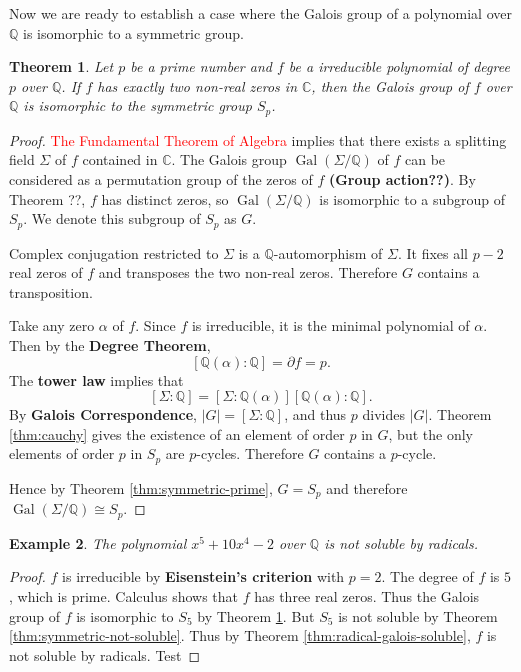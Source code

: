 \documentclass[12pt]{article}
\newtheorem{theorem}{Theorem}
\newtheorem{example}[theorem]{Example}
\newcommand{\Gal}{\operatorname{Gal}}
\begin{document}
Now we are ready to establish a case where the Galois group of a polynomial
over $\mathbb Q$ is isomorphic to a symmetric group.

\begin{theorem} \label{thm:galois-iso-symmetric}
    Let $p$ be a prime number and $f$ be a irreducible polynomial of degree $p$
    over $\mathbb Q$. If $f$ has exactly two non-real zeros in $\mathbb C$,
    then
    the Galois group of $f$ over $\mathbb Q$ is isomorphic to the symmetric
    group
    $S_p$.
\end{theorem}

\begin{proof}
    \textcolor{red}{The Fundamental Theorem of Algebra} implies that there
    exists a splitting field $\Sigma $ of $f$ contained in $\mathbb C$. The
    Galois
    group $\Gal(\Sigma / \mathbb Q)$ of $f$ can be considered as a permutation
    group of the zeros of $f$ \textbf{(Group action??)}. By Theorem ??, $f$ has
    distinct zeros, so $\Gal(\Sigma / \mathbb Q)$ is isomorphic to a subgroup
    of
    $S_p$. We denote this subgroup of $S_p$ as $G$.

    Complex conjugation restricted to $\Sigma$ is a $\mathbb Q$-automorphism of
    $\Sigma$. It fixes all $p - 2$ real zeros of $f$ and transposes the two
    non-real zeros. Therefore $G$ contains a transposition.

    Take any zero $\alpha$ of $f$. Since $f$ is irreducible, it is the minimal
    polynomial of $\alpha$. Then by the \textbf{Degree Theorem}, $$[\mathbb
                Q(\alpha) : \mathbb Q] = \partial f = p. $$ The \textbf{tower
        law} implies that
    $$[\Sigma : \mathbb Q] = [\Sigma : \mathbb Q(\alpha)] [ \mathbb Q(\alpha) :
        \mathbb Q]. $$ By \textbf{Galois Correspondence}, $|G| = [\Sigma :
        \mathbb Q]$,
    and thus $p$ divides $|G|$. Theorem \ref{thm:cauchy} gives the existence of
    an
    element of order $p$ in $G$, but the only elements of order $p$ in $S_p$
    are
    $p$-cycles. Therefore $G$ contains a $p$-cycle.

    Hence by Theorem \ref{thm:symmetric-prime}, $ G = S_p$ and therefore
    $\Gal(\Sigma / \mathbb Q) \cong S_p$.
\end{proof}

\begin{example}
    The polynomial $x^5 + 10 x^4 - 2$ over $\mathbb Q$ is not soluble by
    radicals.
\end{example}

\begin{proof}
    $f$ is irreducible by \textbf{Eisenstein's criterion} with $p = 2$. The
    degree of $f$ is $5$, which is prime. Calculus shows that $f$ has three
    real
    zeros. Thus the Galois group of $f$ is isomorphic to $S_5$ by Theorem
    \ref{thm:galois-iso-symmetric}. But $S_5$ is not soluble by Theorem
    \ref{thm:symmetric-not-soluble}. Thus by Theorem
    \ref{thm:radical-galois-soluble}, $f$ is not soluble by radicals. Test
\end{proof}
\end{document}
